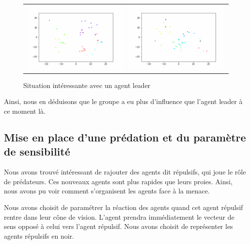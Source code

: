 \documentclass[french, a4paper, 12pt, openany]{report}
\begin{document}
       \begin{figure}[!h]
		\centering
		\begin{tabular}{cc}
			\includegraphics[width=8cm]{images/image_13.png} & \includegraphics[width=8cm]{images/image_14.png} \\
		\end{tabular}
		\caption{Situation intéressante avec un agent leader}
	\end{figure}
       
       Ainsi, nous en déduisons que le groupe a eu plus d'influence que l'agent leader à ce moment là.
       
       
   \subsection{Mise en place d'une prédation et du paramètre de sensibilité}
       
       Nous avons trouvé intéressant de rajouter des agents dit répulsifs, qui joue le rôle de prédateurs. Ces nouveaux agents sont plus rapides que leurs proies. Ainsi, nous avons pu voir comment s'organisent les agents face à la menace.
       
       Nous avons choisit de paramétrer la réaction des agents quand cet agent répulsif rentre dans leur cône de vision. L'agent prendra immédiatement le vecteur de sens opposé à celui vers l'agent répulsif. Nous avons choisit de représenter les agents répulsifs en noir.\\
       
\end{document}
